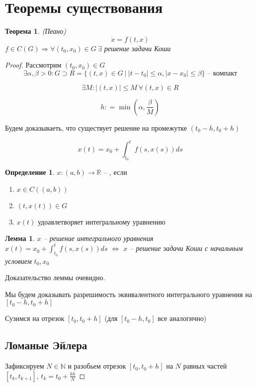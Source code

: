 \documentclass[a4paper]{article}
\theoremstyle{indented}
\newtheorem*{theorem}{Теорема}
\newtheorem*{lemma}{Лемма}
\theoremstyle{definition}
\newtheorem*{defn}{Определение}
\theoremstyle{remark}
\begin{document}
\section{Теоремы существования}
\begin{theorem}
   (Пеано)
  \[\dot x = f(t,x)\]
  $f \in C(G) \Rightarrow \forall (t_0,x_0) \in G \ \exists $ решение задачи Коши
\end{theorem}
\begin{proof}
  Рассмотрим $(t_0,x_0) \in G$
  \[\exists \alpha, \beta > 0 : G \supset R = \{ (t,x) \in G \ | \ |t - t_0| \leqslant \alpha, |x-x_0| \leqslant \beta\} \text{ -- компакт}\] 

  \[\exists M : |(t,x)| \leqslant M \ \forall  (t,x) \in R\] 

  \[h: = \min(\alpha, \frac{\beta}{M})\]

  Будем доказываеть, что существует решение на промежутке $(t_0 - h, t_0 + h)$


  \[x(t) = x_0 +  \int_{t_0}^{t}f(s,x(s)) ds\]
  \begin{defn}
	 $x : (a,b) \to \mathbb{R} $ --
     , если
     \begin{enumerate}
     \item $x \in C((a,b))$
     \item $(t,x(t)) \in G$
     \item $x(t)$ удоавлетворяет интегральному уравнению
     \end{enumerate}
  \end{defn}

  \begin{lemma}
    $x$ -- решение интегрального уравнения $x(t) = x_0 +  \int_{t_0}^{t}f(s,x(s)) ds$
    $\Leftrightarrow$
    $x$ -- решение задачи Коши с начальным условием $t_0,x_0$
  \end{lemma}
  Доказательство леммы очевидно.

  Мы будем доказывать разрешимость эквивалентного интегрального уравнения на $[t_0-h, t_0 + h]$

  Сузимся на отрезок $[t_0,t_0+h]$ (для $[t_0-h, t_0]$ все аналогично)  

  \subsection{Ломаные Эйлера}
  Зафиксируем $N \in \mathbb{N}$ и разобьем отрезок $[t_0,t_0+h]$ на $N$ равных частей $[t_k,t_{k+1}]$, $t_k = t_0 + \frac{kh}{N}$


\end{proof}
\end{document}
